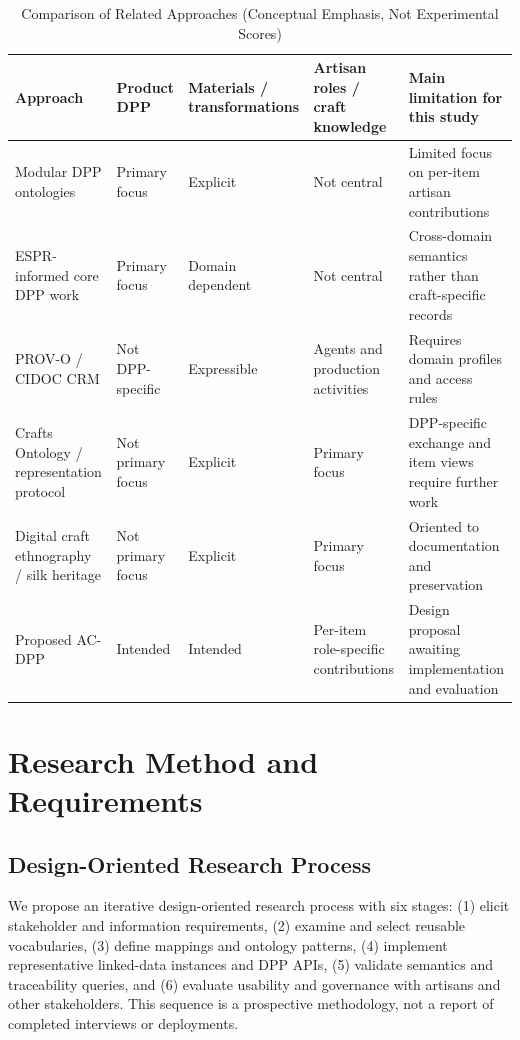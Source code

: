 \documentclass[conference]{IEEEtran}
\begin{document}
\begin{table}[t]
\centering
\caption{Comparison of Related Approaches (Conceptual Emphasis, Not Experimental Scores)}
\label{tab:related}
\scriptsize
\begin{tabular}{>{\raggedright\arraybackslash}p{}>{\raggedright\arraybackslash}p{}>{\raggedright\arraybackslash}p{}>{\raggedright\arraybackslash}p{}>{\raggedright\arraybackslash}p{}}
\toprule
Approach & Product DPP & Materials / transformations & Artisan roles / craft knowledge & Main limitation for this study \\
\midrule
Modular DPP ontologies \cite{kebede2024modular,pourjafarian2025odp} & Primary focus & Explicit & Not central & Limited focus on per-item artisan contributions \\
ESPR-informed core DPP work \cite{robal2026requirements,hbeich2026interop} & Primary focus & Domain dependent & Not central & Cross-domain semantics rather than craft-specific records \\
PROV-O / CIDOC CRM \cite{w3c2013prov,cidoc2024crm} & Not DPP-specific & Expressible & Agents and production activities & Requires domain profiles and access rules \\
Crafts Ontology / representation protocol \cite{zabulis2022representation} & Not primary focus & Explicit & Primary focus & DPP-specific exchange and item views require further work \\
Digital craft ethnography / silk heritage \cite{zabulis2025ethnography,molee2026silk} & Not primary focus & Explicit & Primary focus & Oriented to documentation and preservation \\
Proposed AC-DPP & Intended & Intended & Per-item role-specific contributions & Design proposal awaiting implementation and evaluation \\
\bottomrule
\end{tabular}
\end{table}

\section{Research Method and Requirements}
\subsection{Design-Oriented Research Process}
We propose an iterative design-oriented research process with six stages: (1) elicit stakeholder and information requirements, (2) examine and select reusable vocabularies, (3) define mappings and ontology patterns, (4) implement representative linked-data instances and DPP APIs, (5) validate semantics and traceability queries, and (6) evaluate usability and governance with artisans and other stakeholders. This sequence is a prospective methodology, not a report of completed interviews or deployments.
\end{document}
